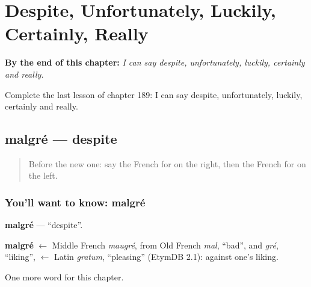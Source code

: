 
\chapter{Despite, Unfortunately, Luckily, Certainly, Really}
\label{ch:fr-despite-unfortunately-luckily-certainly-really}

\begin{chapteropening}
\textbf{By the end of this chapter:} \emph{I can say despite, unfortunately, luckily, certainly and really.}

Complete the last lesson of chapter 189: I can say despite, unfortunately, luckily, certainly and really.
\end{chapteropening}

\section[malgré]{malgré — despite}

\label{lesson:FR-C189-malgre}



\begin{quote}
Before the new one: say the French for on the right, then the French for on the left.
\end{quote}

\subsection*{You'll want to know: malgré}
\textbf{malgré} — \textquotedblleft{}despite\textquotedblright{}.

\begin{cousinweb}
\textbf{malgré} $\leftarrow$ Middle French \emph{maugré}, from Old French \emph{mal}, \textquotedblleft{}bad\textquotedblright{}, and \emph{gré}, \textquotedblleft{}liking\textquotedblright{}, $\leftarrow$ Latin \emph{gratum}, \textquotedblleft{}pleasing\textquotedblright{} (EtymDB 2.1): against one's liking.
\end{cousinweb}

\begin{grammarlens}[title={What you've built}]
One more word for this chapter.
\end{grammarlens}

